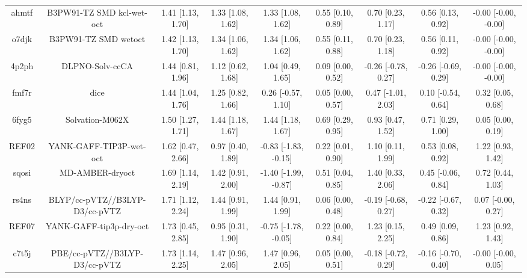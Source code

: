 \documentclass{article}
\begin{document}
\begin{center}
\begin{longtable}{|ccccccccc|}
 ahmtf &                          B3PW91-TZ SMD kcl-wet-oct &  1.41 [1.13, 1.70] &  1.33 [1.08, 1.62] &     1.33 [1.08, 1.62] &  0.55 [0.10, 0.89] &    0.70 [0.23, 1.17] &    0.56 [0.13, 0.92] &  -0.00 [-0.00, -0.00] \\
 o7djk &                               B3PW91-TZ SMD wetoct &  1.42 [1.13, 1.70] &  1.34 [1.06, 1.62] &     1.34 [1.06, 1.62] &  0.55 [0.11, 0.88] &    0.70 [0.23, 1.18] &    0.56 [0.11, 0.92] &  -0.00 [-0.00, -0.00] \\
 4p2ph &                                    DLPNO-Solv-ccCA &  1.44 [0.81, 1.96] &  1.12 [0.62, 1.68] &     1.04 [0.49, 1.65] &  0.09 [0.00, 0.52] &  -0.26 [-0.78, 0.27] &  -0.26 [-0.69, 0.29] &  -0.00 [-0.00, -0.00] \\
 fmf7r &                                               dice &  1.44 [1.04, 1.76] &  1.25 [0.82, 1.66] &    0.26 [-0.57, 1.10] &  0.05 [0.00, 0.57] &   0.47 [-1.01, 2.03] &   0.10 [-0.54, 0.64] &     0.32 [0.05, 0.68] \\
 6fyg5 &                                    Solvation-M062X &  1.50 [1.27, 1.71] &  1.44 [1.18, 1.67] &     1.44 [1.18, 1.67] &  0.69 [0.29, 0.95] &    0.93 [0.47, 1.52] &    0.71 [0.29, 1.00] &     0.05 [0.00, 0.19] \\
 REF02 &                            YANK-GAFF-TIP3P-wet-oct &  1.62 [0.47, 2.66] &  0.97 [0.40, 1.89] &  -0.83 [-1.83, -0.15] &  0.22 [0.01, 0.90] &    1.10 [0.11, 1.99] &    0.53 [0.08, 0.92] &     1.22 [0.93, 1.42] \\
 sqosi &                                    MD-AMBER-dryoct &  1.69 [1.14, 2.19] &  1.42 [0.91, 2.00] &  -1.40 [-1.99, -0.87] &  0.51 [0.04, 0.85] &    1.40 [0.33, 2.06] &   0.45 [-0.06, 0.84] &     0.72 [0.44, 1.03] \\
 rs4ns &                     BLYP/cc-pVTZ//B3LYP-D3/cc-pVTZ &  1.71 [1.12, 2.24] &  1.44 [0.91, 1.99] &     1.44 [0.91, 1.99] &  0.06 [0.00, 0.48] &  -0.19 [-0.68, 0.27] &  -0.22 [-0.67, 0.32] &    0.07 [-0.00, 0.27] \\
 REF07 &                            YANK-GAFF-tip3p-dry-oct &  1.73 [0.45, 2.85] &  0.95 [0.31, 1.90] &  -0.75 [-1.78, -0.05] &  0.22 [0.00, 0.84] &    1.23 [0.15, 2.25] &    0.49 [0.09, 0.86] &     1.23 [0.92, 1.43] \\
 c7t5j &                      PBE/cc-pVTZ//B3LYP-D3/cc-pVTZ &  1.73 [1.14, 2.25] &  1.47 [0.96, 2.05] &     1.47 [0.96, 2.05] &  0.05 [0.00, 0.51] &  -0.18 [-0.72, 0.29] &  -0.16 [-0.70, 0.40] &   -0.00 [-0.00, 0.05] \\

\end{longtable}
\end{center}
\end{document}
